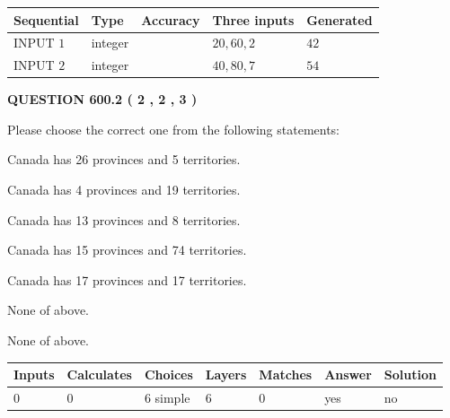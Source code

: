 \documentclass[12pt]{article}
\begin{document}
   
  
  
\noindent\begin{tabular}{|l|l|l|l|l|}
\hline
 Sequential & Type & Accuracy & Three inputs & Generated \\ 
\hline
 
 
  INPUT $  1 $ & integer &  & $
 20
 , 
 60
 , 
 2
 $ & $ 42 $ 
 \\  \hline  
 
 
  INPUT $  2 $ & integer &  & $
 40
 , 
 80
 , 
 7
 $ & $ 54 $ 
 \\  \hline  
 \end{tabular}
   
   
  
\vspace{0.2in}
  
{\textbf{\Large{QUESTION
600.2 
 ( 2 , 2 , 3 )
}}}
  
  
Please choose the correct one from the following statements:
 
 
Canada has  26 provinces and  5 territories.
 
 
Canada has   4 provinces and  19 territories.
 
 
Canada has  13 provinces and  8 territories.
 
 
Canada has  15 provinces and  74 territories.
 
 
Canada has  17 provinces and  17 territories.
 
 
 None of above.
 
 
\noindent{}
 
 
 None of above.
 
 
\noindent{}
 
 
   
   
   
   
\noindent\begin{tabular}{|l|l|l|l|l|l|l|}
 \hline
Inputs & Calculates & Choices & Layers & Matches & Answer & Solution \\ \hline
 0  & 
 0  & 
 6
  simple  
  & 
 6  & 
 0  & 
  yes & 
  no 
  \\ \hline
 \end{tabular}
   
\end{document}
